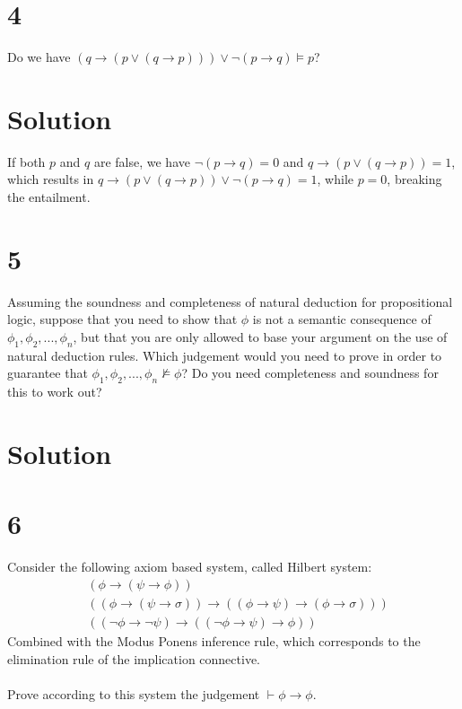 \documentclass[10pt]{article}
\begin{document}
\section*{4}

Do we have $ (q\to (p\lor (q\to p))) \lor \lnot(p\to q) \models p$?

\section*{Solution}

If both $p$ and $q$ are false, we have $\lnot (p \to q) = 0$ and $q\to (p \lor (q\to p)) = 1$, which results in $q\to (p \lor (q\to p)) \lor \lnot (p \to q) = 1$, while $p=0$, breaking the entailment.

\section*{5}

Assuming the soundness and completeness of natural deduction for propositional logic, suppose that you need to show that $\phi$ is not a semantic consequence of $\phi _1, \phi _2, ..., \phi _n$, but that you are only allowed to base your argument on the use of natural deduction rules. Which judgement would you need to prove in order to guarantee that $\phi _1, \phi _2, ..., \phi _n \not\models \phi$? Do you need completeness and soundness for this to work out?

\section*{Solution}


\section*{6}

Consider the following axiom based system, called Hilbert system:
\begin{align*}
& (\phi \to (\psi \to \phi))\\
& ((\phi \to (\psi \to \sigma)) \to ((\phi \to \psi ) \to (\phi \to \sigma)))\\
& ((\lnot \phi \to \lnot \psi ) \to ((\lnot \phi \to \psi ) \to \phi ))
\end{align*}
Combined with the Modus Ponens inference rule, which corresponds to the elimination rule of the implication connective.\\\\
Prove according to this system the judgement $\vdash \phi \to \phi$.
\end{document}
